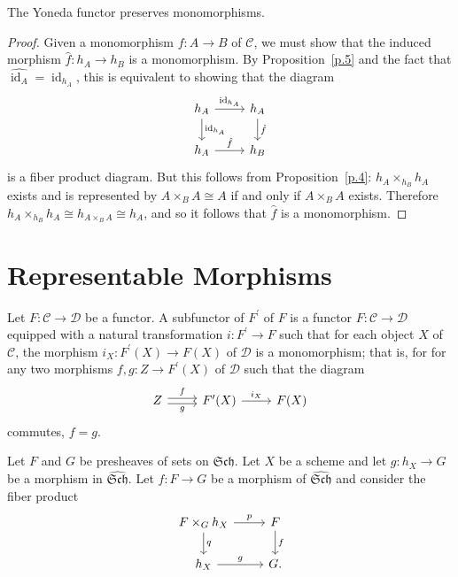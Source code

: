 \documentclass[10pt]{amsart}
\begin{document}
\begin{cor}
  The Yoneda functor preserves monomorphisms.

  \begin{proof}
    Given a monomorphism $f \colon A \rightarrow B$ of $\mathscr{C}$, we must show that the induced morphism $\hat{f} \colon h_A \rightarrow h_B$ is a monomorphism.
    By Proposition~\ref{p.5} and the fact that $\hat{\operatorname{id}_A} = \operatorname{id}_{h_A}$, this is equivalent to showing that the diagram
    $$\begin{tikzcd}
      h_A \arrow{d}{\operatorname{id}_{h_A}}\arrow{r}{\operatorname{id}_{h_A}} & h_A\arrow{d}{\hat{f}}\\
    h_A \arrow{r}{\hat{f}} & h_B
  \end{tikzcd}$$
    is a fiber product diagram.
    But this follows from Proposition~\ref{p.4}: $h_A \times_{h_B} h_A$ exists and is represented by $A \times_B A \cong A$ if and only if $A \times_B A$ exists.
    Therefore $h_A \times_{h_B} h_A \cong h_{A \times_B A} \cong h_A$, and so it follows that $\hat{f}$ is a monomorphism.
  \end{proof}
\end{cor}

\section{Representable Morphisms}
\begin{defn}
  Let $F \colon \mathscr{C} \rightarrow \mathscr{D}$ be a functor.
  A subfunctor of $F^\prime$ of $F$ is a functor $F \colon \mathscr{C} \rightarrow \mathscr{D}$ equipped with a natural transformation $i : F^\prime \rightarrow F$ such that for each object $X$ of $\mathscr{C}$, the morphism $i_X : F^\prime(X) \rightarrow F(X)$ of $\mathscr{D}$ is a monomorphism; that is, for for any two morphisms $f,g \colon Z \rightarrow F^\prime(X)$ of $\mathscr{D}$ such that the diagram
  $$\begin{tikzcd}
    Z \arrow[yshift=-.5ex,swap]{r}{g}\arrow[yshift=.5ex]{r}{f} & F^\prime(X) \arrow{r}{i_X} & F(X)
  \end{tikzcd}$$
  commutes, $f = g$.
\end{defn}

Let $F$ and $G$ be presheaves of sets on $\mathfrak{Sch}$.
Let $X$ be a scheme and let $g \colon h_X \rightarrow G$ be a morphism in $\hat{\mathfrak{Sch}}$.
Let $f \colon F \rightarrow G$ be a morphism of $\hat{\mathfrak{Sch}}$ and consider the fiber product
$$\begin{tikzcd}
  F \times_G h_X \arrow{r}{p}\arrow{d}{q} & F\arrow{d}{f}\\
  h_X \arrow{r}{g} & G.
\end{tikzcd}$$
\end{document}
